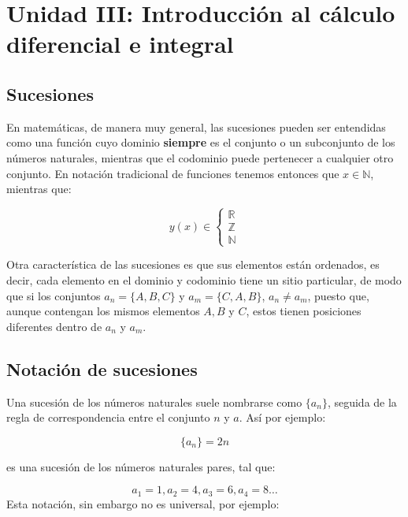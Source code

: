 \documentclass[
]{book}
\begin{document}
\hypertarget{unidad-iii-introducciuxf3n-al-cuxe1lculo-diferencial-e-integral}{%
\chapter{Unidad III: Introducción al cálculo diferencial e integral}\label{unidad-iii-introducciuxf3n-al-cuxe1lculo-diferencial-e-integral}}

\hypertarget{sucesiones}{%
\section{Sucesiones}\label{sucesiones}}

En matemáticas, de manera muy general, las sucesiones pueden ser entendidas como una función cuyo dominio \textbf{siempre} es el conjunto o un subconjunto de los números naturales, mientras que el codominio puede pertenecer a cualquier otro conjunto. En notación tradicional de funciones tenemos entonces que \(x \in \mathbb{N}\), mientras que:

\begin{equation}
y(x) \in \begin{cases}\mathbb{R}\\ \mathbb{Z}\\ \mathbb{N} \end{cases}
\end{equation}

Otra característica de las sucesiones es que sus elementos están ordenados, es decir, cada elemento en el dominio y codominio tiene un sitio particular, de modo que si los conjuntos \(a_n = \{A, B, C\}\) y \(a_m = \{C, A, B\}\), \(a_n \neq a_m\), puesto que, aunque contengan los mismos elementos \(A, B\) y \(C\), estos tienen posiciones diferentes dentro de \(a_n\) y \(a_m\).

\hypertarget{notaciuxf3n-de-sucesiones}{%
\section{Notación de sucesiones}\label{notaciuxf3n-de-sucesiones}}

Una sucesión de los números naturales suele nombrarse como \(\{a_n\}\), seguida de la regla de correspondencia entre el conjunto \(n\) y \(a\). Así por ejemplo:

\[ \{a_n\} = 2n\]

es una sucesión de los números naturales pares, tal que:

\[a_1 = 1, a_2 = 4, a_3 = 6, a_4 = 8 \dots\]
Esta notación, sin embargo no es universal, por ejemplo:
\end{document}
